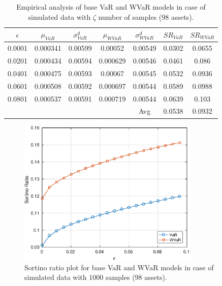 \documentclass[12pt]{article}
\numberwithin{equation}{section}
\begin{document}
\begin{table}[!h]
\centering
\captionsetup{justification=centering}
\begin{tabular}{||c|c|c|c|c|c|c||}
\hline
$\epsilon$ & $\mu_{VaR}$ & $\sigma_{VaR}^{d}$ & $\mu_{WVaR}$ & $\sigma_{WVaR}^{d}$ & $SR_{VaR}$ & $SR_{WVaR}$\\
\hline
0.0001 & 0.000341 & 0.00599 & 0.00052 & 0.00549 & 0.0302 & 0.0655 \\
0.0201 & 0.000434 & 0.00594 & 0.000629 & 0.00546 & 0.0461 & 0.086 \\
0.0401 & 0.000475 & 0.00593 & 0.00067 & 0.00545 & 0.0532 & 0.0936 \\
0.0601 & 0.000508 & 0.00592 & 0.000697 & 0.00544 & 0.0589 & 0.0988 \\
0.0801 & 0.000537 & 0.00591 & 0.000719 & 0.00544 & 0.0639 & 0.103 \\
\hline
& & & & Avg & 0.0538 & 0.0932 \\
\hline
\end{tabular}
\caption{Empirical analysis of base VaR and WVaR models in case of simulated data with $\zeta$ number of samples (98 assets).}
\label{tab:5.5}
\end{table}

\begin{figure}[!h]
\centering
\includegraphics[height=7.0cm]{var_100s_1000.eps}
\caption{Sortino ratio plot for base VaR and WVaR models in case of simulated data with $1000$ samples (98 assets).}
\label{fig:5.6}
\end{figure}
\end{document}

